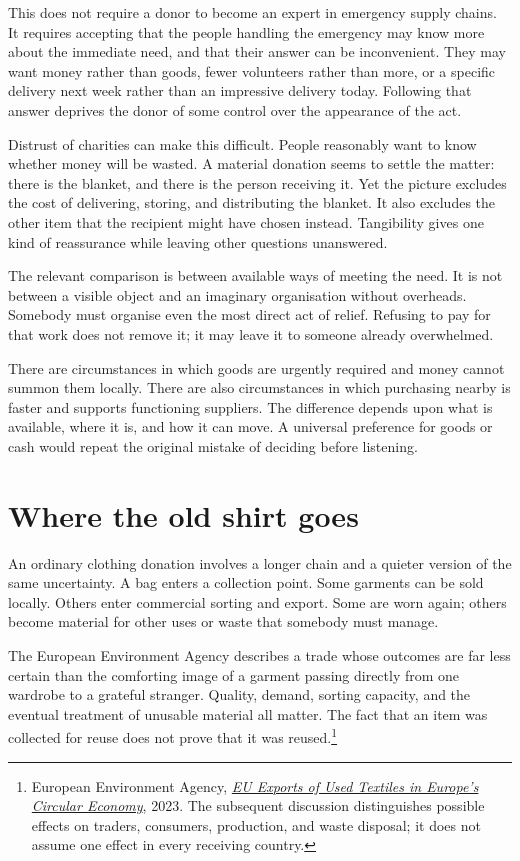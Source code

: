 \documentclass[12pt,a4paper]{book}
\begin{document}
This does not require a donor to become an expert in emergency supply chains. It requires accepting that the people handling the emergency may know more about the immediate need, and that their answer can be inconvenient. They may want money rather than goods, fewer volunteers rather than more, or a specific delivery next week rather than an impressive delivery today. Following that answer deprives the donor of some control over the appearance of the act.

Distrust of charities can make this difficult. People reasonably want to know whether money will be wasted. A material donation seems to settle the matter: there is the blanket, and there is the person receiving it. Yet the picture excludes the cost of delivering, storing, and distributing the blanket. It also excludes the other item that the recipient might have chosen instead. Tangibility gives one kind of reassurance while leaving other questions unanswered.

The relevant comparison is between available ways of meeting the need. It is not between a visible object and an imaginary organisation without overheads. Somebody must organise even the most direct act of relief. Refusing to pay for that work does not remove it; it may leave it to someone already overwhelmed.

There are circumstances in which goods are urgently required and money cannot summon them locally. There are also circumstances in which purchasing nearby is faster and supports functioning suppliers. The difference depends upon what is available, where it is, and how it can move. A universal preference for goods or cash would repeat the original mistake of deciding before listening.

\section*{Where the old shirt goes}

An ordinary clothing donation involves a longer chain and a quieter version of the same uncertainty. A bag enters a collection point. Some garments can be sold locally. Others enter commercial sorting and export. Some are worn again; others become material for other uses or waste that somebody must manage.

The European Environment Agency describes a trade whose outcomes are far less certain than the comforting image of a garment passing directly from one wardrobe to a grateful stranger. Quality, demand, sorting capacity, and the eventual treatment of unusable material all matter. The fact that an item was collected for reuse does not prove that it was reused.\footnote{European Environment Agency, \href{https://www.eea.europa.eu/en/analysis/publications/eu-exports-of-used-textiles}{\emph{EU Exports of Used Textiles in Europe's Circular Economy}}, 2023. The subsequent discussion distinguishes possible effects on traders, consumers, production, and waste disposal; it does not assume one effect in every receiving country.}
\end{document}
